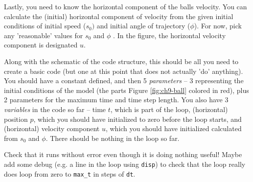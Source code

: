 \documentclass{tufte-book} %
\begin{document}
Lastly, you need to know the horizontal component of the balls velocity.  You can calculate the (initial) horizontal component of velocity from the given initial conditions of initial speed (\(s_{0})\) and initial angle of trajectory (\(\phi\)). For now, pick any 'reasonable' values for \(s_{0}\)  and \(\phi\) . In the figure, the horizontal velocity component is designated \(u\).

Along with the schematic of the code structure, this should be all you need to create a basic code (but one at this point that does not actually 'do' anything). You should have a constant defined, and then 5 \textit{parameters} --  3 representing the initial conditions of the model (the parts  Figure \ref{fig:ch9-ball} colored in red), plus 2 parameters for the maximum time and time step length. You also have 3 \textit{variables} in the code so far -- time \(t\), which is part of the loop, (horizontal) position \(p\), which you should have initialized to zero before the loop starts, and  (horizontal) velocity component \(u\), which you should have initialized calculated from \(s_{0}\) and \(\phi\). There should be nothing in the loop so far.

Check that it runs without error even though it is doing nothing useful! Maybe add some debug (e.g. a line in the loop using \texttt{disp}) to check that the loop really does loop from zero to \texttt{max\_t} in steps of \texttt{dt}.
\end{document}
